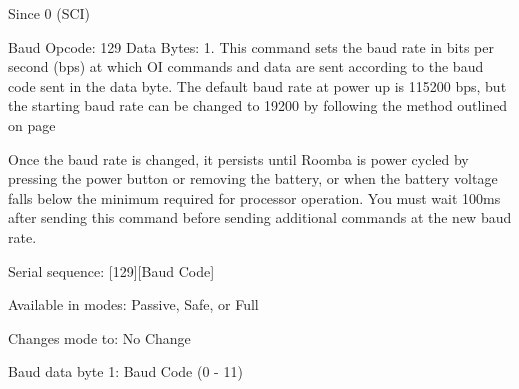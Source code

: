 \begin{Desc}
\begin{description}
\begin{DoxySince}{Since}
0 (S\+C\+I) 
\end{DoxySince}
\item[{\em 
\hypertarget{group__roomba-lib_gga305e17dfb7050ad83ea49ded2e6a2e24a2461f308d895f39a96b6002f55753b6e}{}R\+O\+O\+M\+B\+A\+\_\+\+B\+A\+U\+D\label{group__roomba-lib_gga305e17dfb7050ad83ea49ded2e6a2e24a2461f308d895f39a96b6002f55753b6e}
}]Baud Opcode\+: 129 Data Bytes\+: 1. This command sets the baud rate in bits per second (bps) at which O\+I commands and data are sent according to the baud code sent in the data byte. The default baud rate at power up is 115200 bps, but the starting baud rate can be changed to 19200 by following the method outlined on page
\begin{DoxyEnumerate}
\item Once the baud rate is changed, it persists until Roomba is power cycled by pressing the power button or removing the battery, or when the battery voltage falls below the minimum required for processor operation. You must wait 100ms after sending this command before sending additional commands at the new baud rate.
\begin{DoxyItemize}
\item Serial sequence\+: \mbox{[}129\mbox{]}\mbox{[}Baud Code\mbox{]}
\item Available in modes\+: Passive, Safe, or Full
\item Changes mode to\+: No Change
\item Baud data byte 1\+: Baud Code (0 -\/ 11)
\end{DoxyItemize}
\end{DoxyEnumerate}


\end{description}
\end{Desc}
